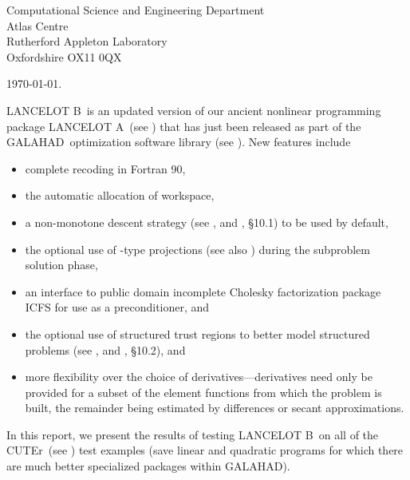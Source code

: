 \documentclass[11pt,twoside]{article}
\newcommand{\gal}{{\sf GALAHAD}}
\newcommand{\lana}{{\sf LANCELOT A}}
\newcommand{\lanb}{{\sf LANCELOT B}}
\newcommand{\cuter}{{\sf CUTEr}}
\begin{document}
\begin{titlepage}
\vspace{0.6 cm}

\noindent 
Computational Science and Engineering Department
\\
Atlas Centre
\\
Rutherford Appleton Laboratory
\\
Oxfordshire OX11 0QX

\vspace{0.1 cm}
\noindent \today .

\end{titlepage}




\setcounter{page}{1}

\lanb\ is an updated version of our ancient nonlinear programming 
package \lana\ (see ) that has just been
released as part of the \gal\ optimization software library (see
). New features include
\begin{itemize}
\item complete recoding in Fortran 90,
\item the automatic allocation of workspace,
\item a non-monotone descent strategy (see , and 
, \S10.1) to be used by default,
\item the optional use of -type projections 
   (see also ) 
   during the subproblem solution phase,
\item an interface to  public domain incomplete Cholesky 
   factorization package ICFS for use as a preconditioner, and
\item the optional use of structured trust regions to better model 
   structured problems (see , and
   , \S10.2), and
\item more flexibility over the choice of derivatives---derivatives need
   only be provided for a subset of the element functions from which the 
   problem is built, the remainder being estimated by differences or secant 
   approximations.  
\end{itemize}
In this report, we present the results of testing \lanb\ on all of the 
\cuter\ (see ) test examples (save linear and
quadratic programs for which there are much better specialized 
packages within \gal).
\end{document}
